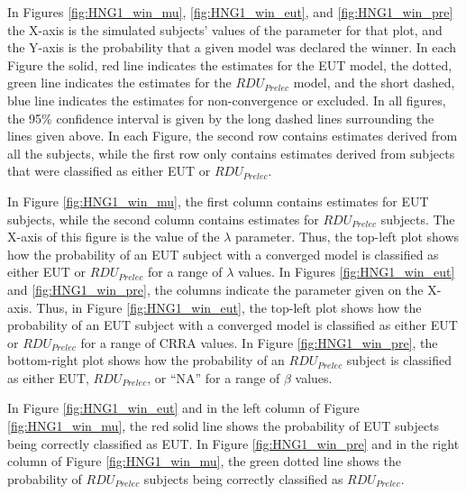 \documentclass[../main.tex]{subfiles}
\begin{document}
In Figures \ref{fig:HNG1_win_mu}, \ref{fig:HNG1_win_eut}, and \ref{fig:HNG1_win_pre} the X-axis is the simulated subjects' values of the parameter for that plot, and the Y-axis is the probability that a given model was declared the winner.
In each Figure the solid, red line indicates the estimates for the EUT model, the dotted, green line indicates the estimates for the $\mathit{RDU_{Prelec}}$ model, and the short dashed, blue line indicates the estimates for non-convergence or excluded.
In all figures, the 95\% confidence interval is given by the long dashed lines surrounding the lines given above.
In each Figure, the second row contains estimates derived from all the subjects, while the first row only contains estimates derived from subjects that were classified as either EUT or $\mathit{RDU_{Prelec}}$.

In Figure \ref{fig:HNG1_win_mu}, the first column contains estimates for EUT subjects, while the second column contains estimates for $\mathit{RDU_{Prelec}}$ subjects.
The X-axis of this figure is the value of the $\lambda$ parameter.
Thus, the top-left plot shows how the probability of an EUT subject with a converged model is classified as either EUT or $\mathit{RDU_{Prelec}}$ for a range of $\lambda$ values.
In Figures \ref{fig:HNG1_win_eut} and \ref{fig:HNG1_win_pre}, the columns indicate the parameter given on the X-axis.
Thus, in Figure \ref{fig:HNG1_win_eut}, the top-left plot shows how the probability of an EUT subject with a converged model is classified as either EUT or $\mathit{RDU_{Prelec}}$ for a range of CRRA values.
In Figure \ref{fig:HNG1_win_pre}, the bottom-right plot shows how the probability of an $\mathit{RDU_{Prelec}}$ subject is classified as either EUT, $\mathit{RDU_{Prelec}}$, or \enquote{NA} for a range of $\beta$ values.

In Figure \ref{fig:HNG1_win_eut} and in the left column of Figure \ref{fig:HNG1_win_mu}, the red solid line shows the probability of EUT subjects being correctly classified as EUT.
In Figure \ref{fig:HNG1_win_pre} and in the right column of Figure \ref{fig:HNG1_win_mu}, the green dotted line shows the probability of $\mathit{RDU_{Prelec}}$ subjects being correctly classified as $\mathit{RDU_{Prelec}}$.
\end{document}
